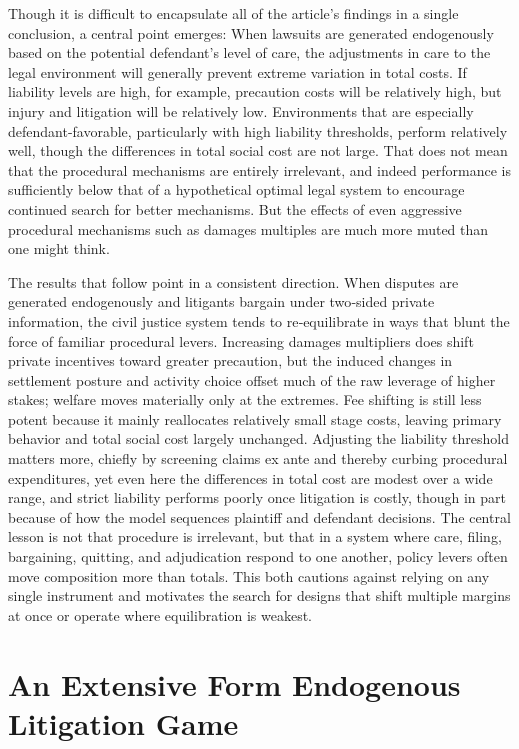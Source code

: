 \documentclass{article}
\begin{document}
Though it is difficult to encapsulate all of the article's findings in a single conclusion, a central point emerges: When lawsuits are generated endogenously based on the potential defendant's level of care, the adjustments in care to the legal environment will generally prevent extreme variation in total costs. If liability levels are high, for example, precaution costs will be relatively high, but injury and litigation will be relatively low. Environments that are especially defendant-favorable, particularly with high liability thresholds, perform relatively well, though the differences in total social cost are not large. That does not mean that the procedural mechanisms are entirely irrelevant, and indeed performance is sufficiently below that of a hypothetical optimal legal system to encourage continued search for better mechanisms. But the effects of even aggressive procedural mechanisms such as damages multiples are much more muted than one might think. 

The results that follow point in a consistent direction. When disputes are generated endogenously and litigants bargain under two‑sided private information, the civil justice system tends to re‑equilibrate in ways that blunt the force of familiar procedural levers. Increasing damages multipliers does shift private incentives toward greater precaution, but the induced changes in settlement posture and activity choice offset much of the raw leverage of higher stakes; welfare moves materially only at the extremes. Fee shifting is still less potent because it mainly reallocates relatively small stage costs, leaving primary behavior and total social cost largely unchanged. Adjusting the liability threshold matters more, chiefly by screening claims ex ante and thereby curbing procedural expenditures, yet even here the differences in total cost are modest over a wide range, and strict liability performs poorly once litigation is costly, though in part because of how the model sequences plaintiff and defendant decisions. The central lesson is not that procedure is irrelevant, but that in a system where care, filing, bargaining, quitting, and adjudication respond to one another, policy levers often move composition more than totals. This both cautions against relying on any single instrument and motivates the search for designs that shift multiple margins at once or operate where equilibration is weakest.

\section{An Extensive Form Endogenous Litigation Game}
\end{document}
